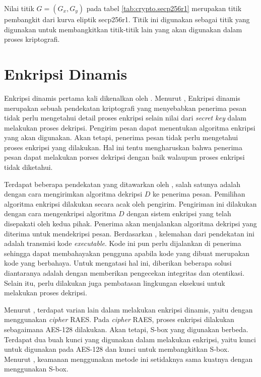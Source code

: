 Nilai titik $G = (G_x, G_y)$ pada tabel \ref{tab:crypto.secp256r1} merupakan titik pembangkit dari kurva eliptik secp256r1. Titik ini digunakan sebagai titik yang digunakan untuk membangkitkan titik-titik lain yang akan digunakan dalam proses kriptografi.

\section{Enkripsi Dinamis}
Enkripsi dinamis pertama kali dikenalkan oleh \textcite{knudsen2015}. Menurut \textcite{knudsen2015}, Enkripsi dinamis merupakan sebuah pendekatan kriptografi yang menyebabkan penerima pesan tidak perlu mengetahui detail proses enkripsi selain nilai dari \emph{secret key} dalam melakukan proses dekripsi. Pengirim pesan dapat menentukan algoritma enkripsi yang akan digunakan. Akan tetapi, penerima pesan tidak perlu mengetahui proses enkripsi yang dilakukan. Hal ini tentu mengharuskan bahwa penerima pesan dapat melakukan porses dekripsi dengan baik walaupun proses enkripsi tidak diketahui. 

Terdapat beberapa pendekatan yang ditawarkan oleh \textcite{knudsen2015}, salah satunya adalah dengan cara mengirimkan algoritma dekripsi $D$ ke penerima pesan. Pemilihan algoritma enkripsi dilakukan secara acak oleh pengirim. Pengiriman ini dilakukan dengan cara mengenkripsi algoritma $D$ dengan sistem enkripsi yang telah disepakati oleh kedua pihak. Penerima akan menjalankan algoritma dekripsi yang diterima untuk mendekripsi pesan. Berdasarkan \textcite{knudsen2015}, kelemahan dari pendekatan ini adalah transmisi kode \emph{executable}. Kode ini pun perlu dijalankan di penerima sehingga dapat membahayakan pengguna apabila kode yang dibuat merupakan kode yang berbahaya. Untuk mengatasi hal ini, diberikan beberapa solusi diantaranya adalah dengan memberikan pengecekan integritas dan otentikasi. Selain itu, perlu dilakukan juga pembatasan lingkungan eksekusi untuk melakukan proses dekripsi.

Menurut \textcite{knudsen2015}, terdapat varian lain dalam melakukan enkripsi dinamis, yaitu dengan menggunakan \emph{cipher} RAES. Pada \emph{cipher} RAES, proses enkripsi dilakukan sebagaimana AES-128 dilakukan. Akan tetapi, S-box yang digunakan berbeda. Terdapat dua buah kunci yang digunakan dalam melakukan enkripsi, yaitu kunci untuk digunakan pada AES-128 dan kunci untuk membangkitkan S-box. Menurut \textcite{knudsen2015}, keamanan menggunakan metode ini setidaknya sama kuatnya dengan menggunakan S-box.

